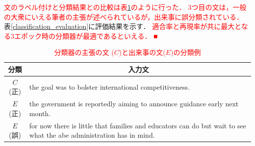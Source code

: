 \documentclass[a4paper, twocolumn, 10pt]{jarticle}
\begin{document}
\textcolor{red}{
  文のラベル付けと分類結果との比較は表\ref{classification_example}のように行った．
  3つ目の文は，一般の大衆にいえる筆者の主張が述べられているが，出来事に誤分類されている．
}
表\ref{classification_evaluation}に評価結果を示す．
\textcolor{red}{
適合率と再現率が共に最大となる3エポック時の分類器が最適であるといえる．
■
}

\begin{table}[H]
  \caption{\textcolor{red}{分類器の主張の文 ($C$)と出来事の文($E$)の分類例}}
  \centering
  {\tabcolsep=0.1cm
  \begin{tabular}{cp{6.5cm}}
      \hline
      分類 & \multicolumn{1}{c}{入力文}
      \\
      \hline
      $C$(正) & the goal was to bolster international competitiveness.
      \\
      $E$(正) & the government is reportedly aiming to announce guidance early next month.
      \\
      $E$(誤) & for now there is little that families and educators can do but wait to see what the abe administration has in mind.
      \\
      \hline
    \end{tabular}
    \label{classification_example}
    }
\end{table}
\end{document}
